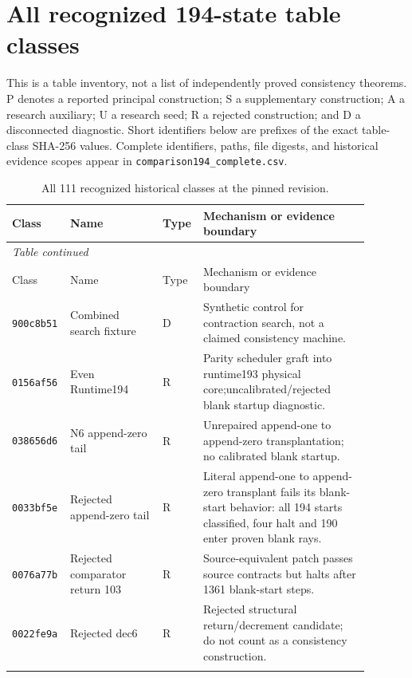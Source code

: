 \section{All recognized 194-state table classes}
\label{app:comparison-classes}
This is a table inventory, not a list of independently proved consistency theorems. P denotes a reported principal construction; S a supplementary construction; A a research auxiliary; U a research seed; R a rejected construction; and D a disconnected diagnostic. Short identifiers below are prefixes of the exact table-class SHA-256 values. Complete identifiers, paths, file digests, and historical evidence scopes appear in \texttt{comparison194\_complete.csv}.
\begingroup\small\setlength{\tabcolsep}{3pt}\renewcommand{\arraystretch}{1.07}
\begin{longtable}{p{0.12\linewidth}p{0.25\linewidth}p{0.07\linewidth}p{0.45\linewidth}}
\caption{All 111 recognized historical classes at the pinned revision.}\label{tab:comparison-all-classes}\\
\toprule Class & Name & Type & Mechanism or evidence boundary \\ \midrule\endfirsthead
\multicolumn{4}{l}{\emph{Table \thetable{} continued}}\\
\toprule Class & Name & Type & Mechanism or evidence boundary \\ \midrule\endhead
\bottomrule\endfoot
\texttt{900c8b51} & Combined search fixture & D & Synthetic control for contraction search, not a claimed consistency machine. \\ \addlinespace[2pt]
\texttt{0156af56} & Even Runtime194 & R & Parity scheduler graft into runtime193 physical core;uncalibrated/rejected blank startup diagnostic. \\ \addlinespace[2pt]
\texttt{038656d6} & N6 append-zero tail & R & Unrepaired append-one to append-zero transplantation; no calibrated blank startup. \\ \addlinespace[2pt]
\texttt{0033bf5e} & Rejected append-zero tail & R & Literal append-one to append-zero transplant fails its blank-start behavior: all 194 starts classified, four halt and 190 enter proven blank rays. \\ \addlinespace[2pt]
\texttt{0076a77b} & Rejected comparator return 103 & R & Source-equivalent patch passes source contracts but halts after 1361 blank-start steps. \\ \addlinespace[2pt]
\texttt{0022fe9a} & Rejected dec6 & R & Rejected structural return/decrement candidate; do not count as a consistency construction. \\ \addlinespace[2pt]

\end{longtable}
